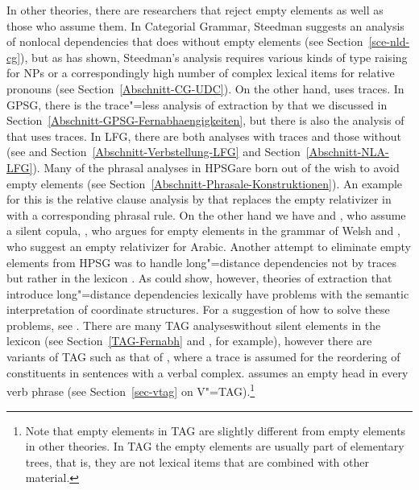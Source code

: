 \addlines
In other theories, there are researchers that reject empty elements as well as those who assume them.
In Categorial Grammar\indexcg, Steedman suggests an analysis of nonlocal dependencies that does
without empty elements (see Section~\ref{sce-nld-cg}), but as \citet{Pollard88a} has shown,
Steedman's analysis requires various kinds of type raising
for NPs or a correspondingly high number of complex lexical items for relative
pronouns (see Section~\ref{Abschnitt-CG-UDC}). On the other hand, 
\citet{KoenigE99a-u} uses traces. In GPSG\indexgpsg, there is the
trace"=less analysis of extraction by \citet[--77]{Uszkoreit87a} that we
discussed in  Section~\ref{Abschnitt-GPSG-Fernabhaengigkeiten}, but there is also the analysis of
\citet*[]{GKPS85a} that uses traces. In LFG\indexlfg, there are both analyses with traces
\citep[]{Bresnan2001a} and those without (see  and
Section~\ref{Abschnitt-Verbstellung-LFG} and Section~\ref{Abschnitt-NLA-LFG}).  
Many of the phrasal analyses in HPSG\indexhpsg are born out of the wish to avoid empty elements (see Section~\ref{Abschnitt-Phrasale-Konstruktionen}). 
An example for this is the relative clause analysis by \citet{Sag97a} that replaces the empty
relativizer in  with a corresponding phrasal rule. On the other hand we have
 and , who assume a silent copula,
, who argues for empty elements in the grammar of Welsh and \citet{AB2012a}, who suggest an empty relativizer for Arabic. Another
attempt to eliminate empty elements from HPSG was to handle long"=distance dependencies not by
traces but rather in the lexicon \citep*{BMS2001a}. As \citet{LH2006a} could show, however, theories
of extraction that introduce long"=distance dependencies lexically have problems with the semantic
interpretation of coordinate structures. For a suggestion of how to solve these problems, see
. There are many TAG analyses\indextag without silent elements in the lexicon
(see Section~\ref{TAG-Fernabh} and , for example), however there are variants of TAG
such as that of \citet[]{Kallmeyer2005a-u}, where a trace is assumed for the reordering of
constituents in sentences with a verbal complex. \citet[--11]{Rambow94a} assumes an empty head in every verb
phrase (see Section~\ref{sec-vtag} on V"=TAG).\footnote{%
  Note that empty elements in TAG are slightly different from empty elements in other theories. In
  TAG the empty elements are usually part of elementary trees, that is, they are not lexical items that are
  combined with other material.
}
